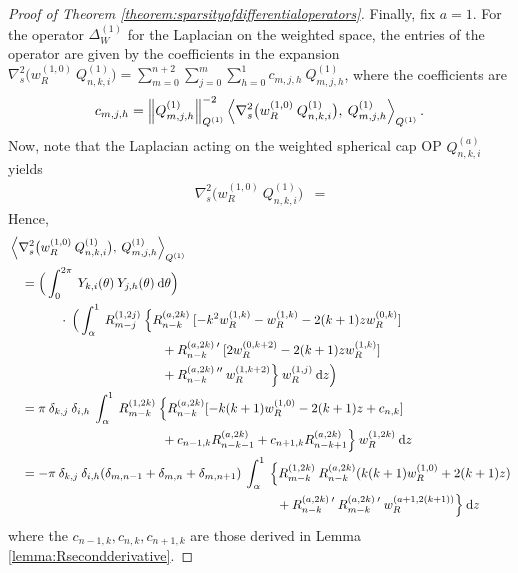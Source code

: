 \documentclass[11pt, oneside]{article}   	%
\newcommand{\genjac}{R}
\newcommand{\genjacnmk}{\genjac_{n-k}}
\newcommand{\genjacmmj}{\genjac_{m-j}}
\newcommand{\genjacw}{w_\genjac}
\newcommand{\scop}{Q}
\newcommand{\scopnki}{\scop_{n,k,i}}
\newcommand{\scopmjh}{\scop_{m,j,h}}
\newcommand{\ch}{Y}
\newcommand{\chki}{\ch_{k,i}}
\newcommand{\chjh}{\ch_{j,h}}
\begin{document}
\begin{proof}[Proof of Theorem \ref{theorem:sparsityofdifferentialoperators}]
Finally, fix $a = 1$. For the operator $\Delta^{(1)}_W$ for the Laplacian on the weighted space, the entries of the operator are given by the coefficients in the expansion $\nabla^2_s \big(\genjacw^{(1,0)} \: \scopnki^{(1)} \big) = \sum_{m=0}^{n+2} \sum_{j=0}^m \sum_{h=0}^1 c_{m,j,h} \: \scopmjh^{(1)}$, where the coefficients are
\begin{align*}
	c_{m,j,h} = \norm{\scopmjh^{(1)}}^{-2}_{\scop^{(1)}} \ip<\nabla^2_s \big(\genjacw^{(1,0)} \: \scopnki^{(1)} \big), \: \scopmjh^{(1)}>_{\scop^{(1)}}.
\end{align*}
Now, note that the Laplacian acting on the weighted spherical cap OP $\scopnki^{(a)}$ yields
\begin{align*}
	\nabla^2_s \big(\genjacw^{(1,0)} \: \scopnki^{(1)} \big) &= 
\end{align*}
Hence,
\begin{align*}
	&\ip<\nabla^2_s \big(\genjacw^{(1,0)} \: \scopnki^{(1)} \big), \: \scopmjh^{(1)}>_{\scop^{(1)}} \\
	&\quad = \Big( \int_0^{2\pi} \: \chki(\theta) \: \chjh(\theta) \: \D \theta \Big) \\
	&\quad \quad \quad \quad \cdot \: \Big( \int_\alpha^1 \: \genjacmmj^{(1,2j)} \: \Big\{ \genjacnmk^{(a, 2k)} \: [- k^2 \genjacw^{(1, k)} - \genjacw^{(1, k)} - 2(k + 1)z \genjacw^{(0, k)}] \\
	&\quad \quad \quad \quad \quad \quad \quad \quad \quad \quad \quad \quad + \genjacnmk^{(a, 2k) \: \prime} \: [2 \genjacw^{(0, k+2)} - 2(k + 1)z \genjacw^{(1, k)}] \\
	&\quad \quad \quad \quad \quad \quad \quad \quad \quad \quad \quad \quad + \genjacnmk^{(a, 2k) \: \prime \prime} \: \genjacw^{(1, k+2)} \Big\} \: \genjacw^{(1, j)} \: \D z \Big) \\
	&\quad = \pi \: \delta_{k,j} \: \delta_{i,h} \: \int_\alpha^1 \: \genjac_{m-k}^{(1,2k)} \: \Big\{ \genjacnmk^{(a, 2k)} [-k(k+1) \genjacw^{(1, 0)} - 2(k+1)z + c_{n,k}] \\
	&\quad \quad \quad \quad \quad \quad \quad \quad \quad \quad \quad \quad + c_{n-1,k} \genjac_{n-k-1}^{(a, 2k)} + c_{n+1,k} \genjac_{n-k+1}^{(a, 2k)} \Big\} \: \genjacw^{(1, 2k)} \: \D z \\
	&\quad = - \pi \: \delta_{k,j} \: \delta_{i,h} (\delta_{m,n-1} + \delta_{m,n} + \delta_{m,n+1}) \: \int_\alpha^1 \: \Big\{ \genjac_{m-k}^{(1,2k)} \: \genjacnmk^{(a, 2k)} (k(k+1) \genjacw^{(1, 0)} + 2(k+1)z) \\ 
	&\quad \quad \quad \quad \quad \quad \quad \quad \quad \quad \quad \quad \quad \quad \quad \quad \quad \quad \quad \quad \quad + \genjacnmk^{(a,2k) \: \prime} \: \genjac_{m-k}^{(a,2k) \: \prime} \: \genjacw^{(a+1, 2(k+1))} \Big\} \: \D z
\end{align*}
where the $c_{n-1,k}, c_{n,k}, c_{n+1,k}$ are those derived in Lemma \ref{lemma:Rsecondderivative}.
\end{proof}
\end{document}
